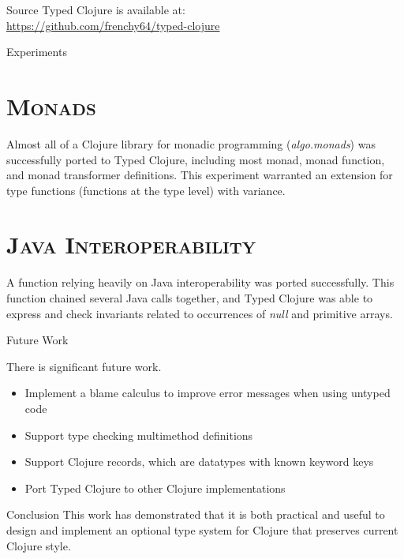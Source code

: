 \documentclass[landscape,final,a0paper,fontscale=0.277]{baposter}
\begin{document}
\begin{poster}
\begin{posterbox}[name=source,column=2]{Source}
Typed Clojure is available at:\\\url{https://github.com/frenchy64/typed-clojure}
\end{posterbox}


\begin{posterbox}[name=experiments,column=2,below=source]{Experiments}

\section*{\textsc{Monads}}

Almost all of a Clojure library for monadic programming (\emph{algo.monads}) was successfully ported
to Typed Clojure, including most monad, monad function, and monad transformer definitions.
This experiment warranted an extension for type functions (functions at the type level) with variance.

\section*{\textsc{Java Interoperability}}

A function relying heavily on Java interoperability was ported successfully.
This function chained several Java calls together, and
Typed Clojure was able to express and check invariants related to occurrences of \emph{null}
and primitive arrays.

\end{posterbox}

\begin{posterbox}[name=futurework,column=2,below=experiments]{Future Work}

There is significant future work.

\begin{itemize}
\item Implement a blame calculus to improve error messages when using untyped code
\item Support type checking multimethod definitions
\item Support Clojure records, which are datatypes with known keyword keys
\item Port Typed Clojure to other Clojure implementations
\end{itemize}

\end{posterbox}

\begin{posterbox}[name=conclusion,column=2,below=futurework]{Conclusion}
This work has demonstrated that it is both practical and useful to
design and implement an optional type system for Clojure that preserves
current Clojure style.
\end{posterbox}


\end{poster}
\end{document}
